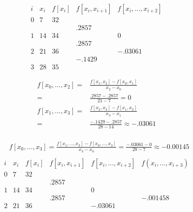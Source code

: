 \documentclass{exam}
\begin{document}
\begin{enumerate}
\begin{enumerate}
\begin{minipage}{0.415\textwidth}
\begin{equation*}
\begin{array}{ccccc}
                    i & x_i & f[x_i]&f[x_i,x_{i+1}] &f[x_i,...,x_{i+2}]\\\hline
                    0 & 7   & 32    \\
                      &     &       & .2857\\
                    1 & 14  & 34    &               & 0\\
                      &     &       & .2857         \\
                    2 & 21  & 36    &               & -.03061\\
                      &     &       & -.1429\\
                    3 & 28  & 35
                \end{array}
            \end{equation*}
        \end{minipage}
        \begin{minipage}{0.585\textwidth} 
            \begin{align*}
                f[x_0,...,x_2]  =& \frac{f[x_1,x_2] - f[x_0,x_1]}{x_2-x_0} \\
                                =& \frac{.2857-.2857}{21-7} = 0\\
                f[x_1,...,x_3]  =& \frac{f[x_2,x_3] - f[x_1,x_2]}{x_3-x_1}\\
                                =& \frac{-.1429-.2857}{28-14} \approx -.03061\\
            \end{align*}
        \end{minipage}
        \begin{align*}
            &f[x_0,...,x_3]= \frac{f[x_1,...,x_3] - f[x_0,...,x_2]}{x_3-x_0} = \frac{-.03061-0}{28-7} \approx -0.00145\\
        \end{align*}
        \begin{equation*}
            \begin{array}{cccccc}
                i & x_i & f[x_i]&f[x_i,x_{i+1}] &f[x_i,...,x_{i+2}] &f(x_i,...,x_{i+3})\\\hline
                0 & 7   & 32    \\
                  &     &       & .2857\\
                1 & 14  & 34    &               & 0\\
                  &     &       & .2857         &                   &-.001458\\
                2 & 21  & 36    &               & -.03061\\

\end{array}
\end{equation*}
\end{enumerate}
\end{enumerate}
\end{document}
